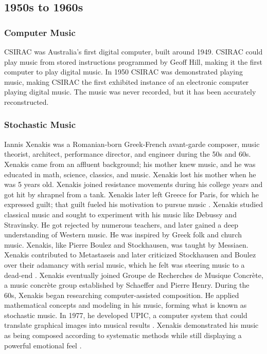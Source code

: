 \documentclass[letterpaper, 12pt]{article}
\begin{document}
\subsection{1950s to 1960s}

\subsubsection{Computer Music}


%
CSIRAC \citep{doornbusch2004computer} was Australia's first digital computer, built around 1949.
%
CSIRAC could play music from stored instructions programmed by Geoff Hill, making it the first computer to play digital music.
%
In 1950 CSIRAC was demonstrated playing music, making CSIRAC the first exhibited instance of an electronic computer playing digital music.
%
The music was never recorded, but it has been accurately reconstructed.

\subsubsection{Stochastic Music}


%
Iannis Xenakis was a Romanian-born Greek-French avant-garde composer, music theorist, architect, performance director, and engineer during the 50s and 60s.
%
Xenakis came from an affluent background; his mother knew music, and he was educated in math, science, classics, and music.
%
Xenakis lost his mother when he was 5 years old.
%
Xenakis joined resistance movements during his college years and got hit by shrapnel from a tank.
%
Xenakis later left Greece for Paris, for which he expressed guilt; that guilt fueled his motivation to pursue music \citep{varga1996conversations}.
%
Xenakis studied classical music and sought to experiment with his music like Debussy and Stravinsky. 
%
He got rejected by numerous teachers, and later gained a deep understanding of Western music.
%
He was inspired by Greek folk and church music.
%
Xenakis, like Pierre Boulez and Stockhausen, was taught by Messiaen. 
%
Xenakis contributed to Metastaseis and later criticized Stockhausen and Boulez over their adamancy with serial music, which he felt was steering music to a dead-end \citep{slabihoudek2022sound}.
%
Xenakis eventually joined Groupe de Recherches de Musique Concrète, a music concrète group established by Schaeffer and Pierre Henry.
%
During the 60s, Xenakis began researching computer-assisted composition.
%
He applied mathematical concepts and modeling in his music, forming what is known as stochastic music.
%
In 1977, he developed UPIC, a computer system that could translate graphical images into musical results \citep{hugill2018digital}.
%
Xenakis demonstrated his music as being composed according to systematic methods while still displaying a powerful emotional feel \citep{service2013guide}.
\end{document}
